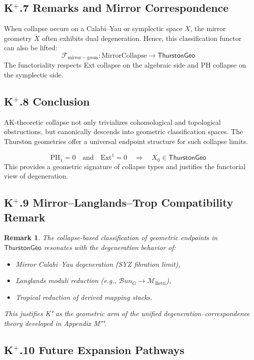 \documentclass[11pt]{article}
\newtheorem{remark}[theorem]{Remark}
\begin{document}
\begin{axiom}
\begin{axiom}
\subsection*{K$^+$.7 Remarks and Mirror Correspondence}

When collapse occurs on a Calabi–Yau or symplectic space \( X \), the mirror geometry \( \check{X} \) often  
exhibits dual degeneration. Hence, this classification functor can also be lifted:
\[
\mathcal{F}_{\mathrm{mirror-geom}} : \mathrm{MirrorCollapse} \to \mathsf{ThurstonGeo}
\]
The functoriality respects Ext collapse on the algebraic side and PH collapse on the symplectic side.

\subsection*{K$^+$.8 Conclusion}

AK-theoretic collapse not only trivializes cohomological and topological obstructions,  
but canonically descends into geometric classification spaces.  
The Thurston geometries offer a universal endpoint structure for such collapse limits.

\[
\boxed{
\mathrm{PH}_1 = 0 \quad \text{and} \quad \mathrm{Ext}^1 = 0 \quad \Rightarrow \quad X_0 \in \mathsf{ThurstonGeo}
}
\]
This provides a geometric signature of collapse types and justifies the functorial view of degeneration.

\subsection*{K$^+$.9 Mirror–Langlands–Trop Compatibility Remark}

\begin{remark}
The collapse-based classification of geometric endpoints in \( \mathsf{ThurstonGeo} \)
resonates with the degeneration behavior of:
\begin{itemize}
  \item Mirror Calabi–Yau degeneration (SYZ fibration limit),
  \item Langlands moduli reduction (e.g., \( \mathcal{B}un_G \to \mathcal{M}_{\text{Betti}} \)),
  \item Tropical reduction of derived mapping stacks.
\end{itemize}
This justifies K⁺ as the geometric arm of the unified degeneration–correspondence theory developed in Appendix M⁺⁺.
\end{remark}

\subsection*{K$^+$.10 Future Expansion Pathways}


\end{axiom}
\end{axiom}
\end{document}
